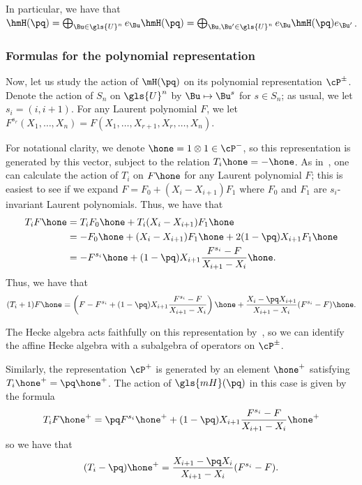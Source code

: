
In particular,
we have that $\hmH(\pq)=\bigoplus_{\Bu\in \gls{U}^n}e_{\Bu}\hmH(\pq)=\bigoplus_{\Bu,\Bu'\in \gls{U}^n}e_{\Bu}\hmH(\pq) e_{\Bu'}$. 

\subsubsection{Formulas for the polynomial representation}
\label{sec:form-polyn-repr}


Now, let us study the action of $\mH(\pq)$ on its polynomial
representation $\cP^{\pm}$. Denote the action of $S_n$ on $\gls{U}^n$ by $\Bu\mapsto \Bu^s$ for $s\in
S_n$; as usual, we let $s_i=(i, i+1)$. For any Laurent polynomial $F$,
we let $F^{s_r}(X_1,\dots,X_n)=F(X_1,\dots,X_{r+1},X_r,\dots, X_n)$. 

For notational clarity, we denote $\hone=1\otimes 1\in \cP^-$, so this
representation is generated by this vector, subject to the relation
$T_i \hone=-\hone$. As in~\cite[(4.3.3)]{MacHecke}, one can calculate the action of $T_i$ on
$F \hone$ 
for any Laurent polynomial $F$; this is easiest to see if we expand
$F=F_0+(X_i-X_{i+1})F_1$ where $F_0$ and $F_1$ are $s_i$-invariant
Laurent polynomials. Thus, we have that 
\begin{align*}
 T_i F\hone&= T_i F_0\hone+T_i(X_i-X_{i+1})F_1\hone\\
 &=-F_0\hone+(X_i-X_{i+1})F_1\hone+2(1-\pq)
X_{i+1}F_1\hone\\
&= -F^{s_i}\hone+ (1-\pq)
X_{i+1}\frac{F^{s_i}-F}{X_{i+1}-X_i}\hone.
\end{align*}
Thus, we have that 
\[(T_i+1) F\hone =\left(F-F^{s_i}+ (1-\pq)
X_{i+1}\frac{F^{s_i}-F}{X_{i+1}-X_i}\right)\hone+\frac{X_i-\pq X_{i+1}}{X_{i+1}-X_i} (F^{s_i}-F)\hone.\]

The Hecke algebra acts faithfully on this
representation by~\cite[(4.3.10)]{MacHecke}, so we can identify the affine Hecke algebra with a
subalgebra of operators on $\cP^\pm$.

Similarly, the representation $\cP^+$ is
generated by an element $\hone^+$ satisfying $T_i\hone^+=\pq \hone^+$.
The action of $\gls{mH}(\pq)$ in this case is given by the formula
\[T_iF\hone^+=\pq F^{s_i}\hone^++(1-\pq)X_{i+1}\frac{F^{s_i}-F}{X_{i+1}-X_i}\hone^+\]
so we have that 
\[(T_i-\pq)\hone^+=\frac{X_{i+1}-\pq X_i}{X_{i+1}-X_i}( F^{s_i}-F).\]

